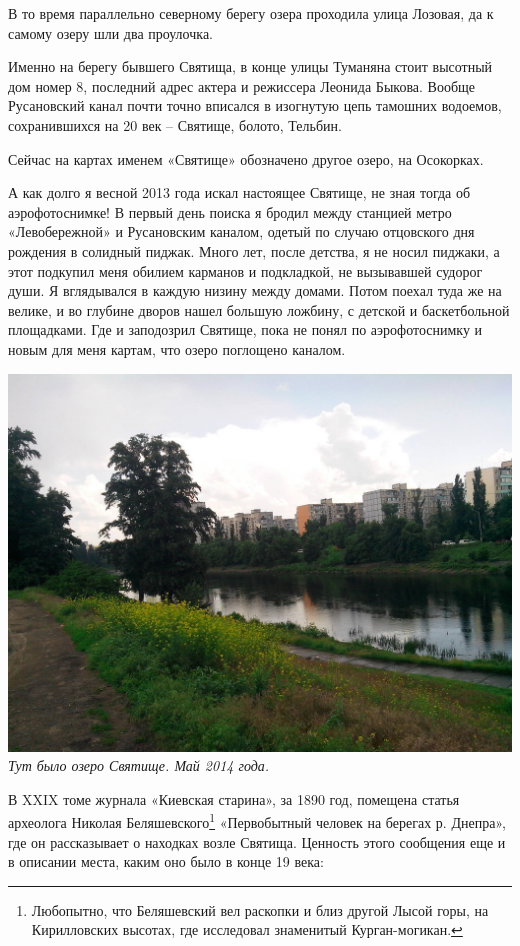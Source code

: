 В то время параллельно северному берегу озера проходила улица Лозовая, да к самому озеру шли два проулочка.

Именно на берегу бывшего Святища, в конце улицы Туманяна стоит высотный дом номер 8, последний адрес актера и режиссера Леонида Быкова. Вообще Русановский канал почти точно вписался в изогнутую цепь тамошних водоемов, сохранившихся на 20 век – Святище, болото, Тельбин.

Сейчас на картах именем «Святище» обозначено другое озеро, на Осокорках.

А как долго я весной 2013 года искал настоящее Святище, не зная тогда об аэрофотоснимке! В первый день поиска я бродил между станцией метро «Левобережной» и Русановским каналом, одетый по случаю отцовского дня рождения в солидный пиджак. Много лет, после детства, я не носил пиджаки, а этот подкупил меня обилием карманов и подкладкой, не вызывавшей судорог души. Я вглядывался в каждую низину между домами. Потом поехал туда же на велике, и во глубине дворов нашел большую ложбину, с детской и баскетбольной площадками. Где и заподозрил Святище, пока не понял по аэрофотоснимку и новым для меня картам, что озеро поглощено каналом.

\begin{center}
\includegraphics[width=\linewidth]{chast-gorodki/cherto/s_svyat-IMG_20140527_134118.jpg}
\textit{Тут было озеро Святище. Май 2014 года.}
\end{center}

В XXIX томе журнала «Киевская старина», за 1890 год, помещена статья археолога Николая Беляшевского\footnote{Любопытно, что Беляшевский вел раскопки и близ другой Лысой горы, на Кирилловских высотах, где исследовал знаменитый Курган-могикан.} «Первобытный человек на берегах р. Днепра», где он рассказывает о находках возле Святища. Ценность этого сообщения еще и в описании места, каким оно было в конце 19 века:

